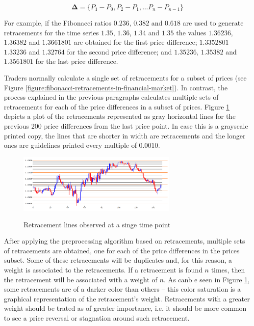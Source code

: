 \begin{equation}
  \label{eq:price-differences}
  \bm{\Delta} = \{ P_1 - P_0, P_2 - P_1, \ldots P_n - P_{n-1} \}
\end{equation}

For example, if the Fibonacci ratios $0.236$, $0.382$ and $0.618$ are used to
generate retracements for the time series $1.35$, $1.36$, $1.34$ and $1.35$ the
values $1.36236$, $1.36382$ and $1.3661801$ are obtained for the first price
difference; $1.3352801$ $1.33236$ and $1.32764$ for the second price difference;
and $1.35236$, $1.35382$ and $1.3561801$ for the last price difference.

Traders normally calculate a single set of retracements for a subset of prices
(see Figure \ref{figure:fibonacci-retracements-in-financial-market}). In
contrast, the process explained in the previous paragraphs calculates multiple
sets of retracements for each of the price differences in a subset of
prices. Figure \ref{figure:retracements-one-price} depicts a plot of the
retracements represented as gray horizontal lines for the previous 200 price
differences from the last price point. In case this is a grayscale printed copy,
the lines that are shorter in width are retracements and the longer ones are
guidelines printed every multiple of $0.0010$.

\begin{figure}
\caption{Retracement lines observed at a singe time point} \centering
\includegraphics[width=0.7\textwidth]{img/retracements-preprocessing-one-price.png}
\label{figure:retracements-one-price}
\end{figure}

After applying the preprocessing algorithm based on retracements, multiple sets
of retracements are obtained, one for each of the price differences in the
prices subset. Some of these retracements will be duplicates and, for this
reason, a weight is associated to the retracements. If a retracement is found
$n$ times, then the retracement will be associated with a weight of $n$. As canb
e seen in Figure \ref{figure:retracements-one-price}, some retracements are of a
darker color than others -- this color saturation is a graphical representation
of the retracement's weight. Retracements with a greater weight should be trated
as of greater importance, i.e. it should be more common to see a price reversal
or stagnation around such retracement.

